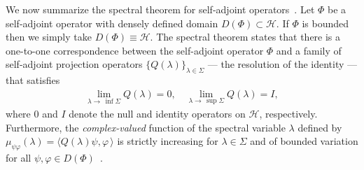 \documentclass[leqno,onefignum,onetabnum]{siamltex1213}
\newcommand{\Hs}{\mathscr{H}}
\begin{document}
We now summarize the spectral theorem for self-adjoint
operators~\cite{Stone:64}. Let $\Phi$ be a self-adjoint operator with
densely defined domain $D(\Phi)\subset\Hs$. If $\Phi$ is bounded
then we simply take $D(\Phi)\equiv\Hs$. The spectral theorem states that 
there is a one-to-one correspondence between the self-adjoint
operator $\Phi$ and a family of self-adjoint projection operators
$\{Q(\lambda)\}_{\lambda\in\Sigma}$ --- the resolution of the identity --- that
satisfies~\cite{Stone:64} 
%
\begin{align}\label{eq:Res_Identity_limits}
  \lim_{\lambda\to\,\inf{\Sigma}}Q(\lambda)=0, \quad
  \lim_{\lambda\to\,\sup{\Sigma}}Q(\lambda)=I,
\end{align}
%
where $0$ and $I$ denote the null and identity operators on $\Hs$,
respectively. Furthermore, the \emph{complex-valued} function of the
spectral variable $\lambda$ defined by $\mu_{\psi\varphi}(\lambda)=\langle Q(\lambda)\psi,\varphi\,\rangle$ is strictly 
increasing for $\lambda\in\Sigma$ and of bounded variation for all
$\psi,\varphi\in D(\Phi)$~\cite{Stone:64}.
\end{document}

